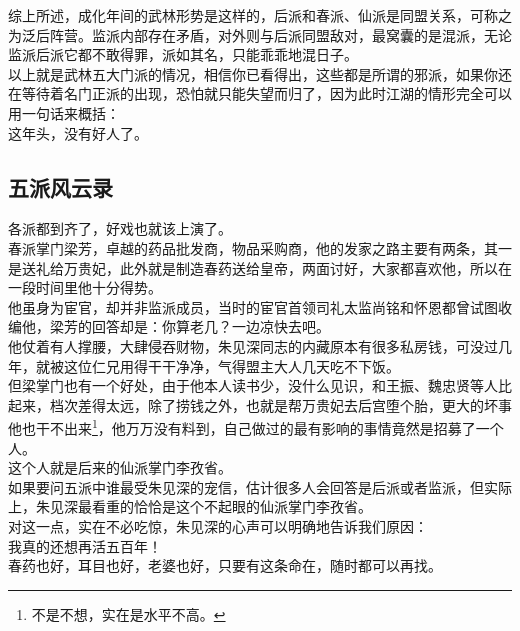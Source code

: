 \begin{multicols}{\theparacolNo}
综上所述，成化年间的武林形势是这样的，后派和春派、仙派是同盟关系，可称之为泛后阵营。监派内部存在矛盾，对外则与后派同盟敌对，最窝囊的是混派，无论监派后派它都不敢得罪，派如其名，只能乖乖地混日子。\\

以上就是武林五大门派的情况，相信你已看得出，这些都是所谓的邪派，如果你还在等待着名门正派的出现，恐怕就只能失望而归了，因为此时江湖的情形完全可以用一句话来概括：\\

这年头，没有好人了。\\

\subsection{五派风云录}
各派都到齐了，好戏也就该上演了。\\

春派掌门梁芳，卓越的药品批发商，物品采购商，他的发家之路主要有两条，其一是送礼给万贵妃，此外就是制造春药送给皇帝，两面讨好，大家都喜欢他，所以在一段时间里他十分得势。\\

他虽身为宦官，却并非监派成员，当时的宦官首领司礼太监尚铭和怀恩都曾试图收编他，梁芳的回答却是：你算老几？一边凉快去吧。\\

他仗着有人撑腰，大肆侵吞财物，朱见深同志的内藏原本有很多私房钱，可没过几年，就被这位仁兄用得干干净净，气得盟主大人几天吃不下饭。\\

但梁掌门也有一个好处，由于他本人读书少，没什么见识，和王振、魏忠贤等人比起来，档次差得太远，除了捞钱之外，也就是帮万贵妃去后宫堕个胎，更大的坏事他也干不出来\footnote{不是不想，实在是水平不高。}，他万万没有料到，自己做过的最有影响的事情竟然是招募了一个人。\\

这个人就是后来的仙派掌门李孜省。\\

如果要问五派中谁最受朱见深的宠信，估计很多人会回答是后派或者监派，但实际上，朱见深最看重的恰恰是这个不起眼的仙派掌门李孜省。\\

对这一点，实在不必吃惊，朱见深的心声可以明确地告诉我们原因：\\

我真的还想再活五百年！\\

春药也好，耳目也好，老婆也好，只要有这条命在，随时都可以再找。\\


\end{multicols}
